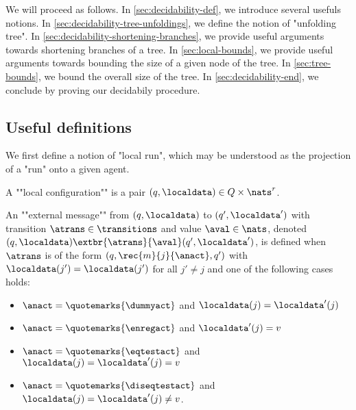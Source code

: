 We will proceed as follows. In \ref{sec:decidability-def}, we introduce several usefuls notions. In \ref{sec:decidability-tree-unfoldings}, we define the notion of "unfolding tree". In \ref{sec:decidability-shortening-branches}, we provide useful arguments towards shortening branches of a tree. In \ref{sec:local-bounds}, we provide useful arguments towards bounding the size of a given node of the tree. In \ref{sec:tree-bounds}, we bound the overall size of the tree. In \ref{sec:decidability-end}, we conclude by proving our decidabily procedure. 



\subsection{Useful definitions}
\label{sec:decidability-defs}

We first define a notion of "local run", which may be understood as the projection of a "run" onto a given agent. 
	
	A ""local configuration"" is a pair $(q, \localdata) \in Q \times \nats^r$. %

	An ""external message"" from $(q,\localdata)$ to $(q',\localdata')$ with transition $\atrans \in \transitions$ and value $\aval \in \nats$, denoted $(q,\localdata) \extbr{\atrans}{\aval} (q',\localdata')$, is defined when $\atrans$ is of the form $(q,\rec{m}{j}{\anact},q')$ with $\localdata(j') = \localdata(j')$ for all $j' \neq j$ and one of the following cases holds:
	
	\begin{minipage}[t]{6cm}
		\begin{itemize}
			\item $\anact = \quotemarks{\dummyact}$ 
			and $\localdata(j) = \localdata'(j)$
			\item $\anact = \quotemarks{\enregact}$ and $\localdata'(j) = v$
		\end{itemize}
	\end{minipage}
	\begin{minipage}[t]{6cm}
		\begin{itemize}
			\item $\anact = \quotemarks{\eqtestact}$ and $\localdata(j) = \localdata'(j)= v$
			\item $\anact = \quotemarks{\diseqtestact}$ and $\localdata(j) = \localdata'(j) \ne v$.
		\end{itemize}
	\end{minipage}
	
